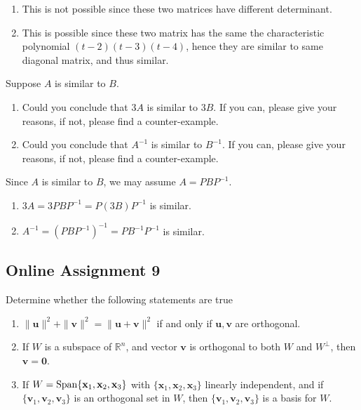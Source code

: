 \documentclass[a4paper,10pt]{article}
\begin{document}
\begin{solution}
\begin{enumerate}[label=\alph*)]
\item This is not possible since these two matrices have different determinant.
\item This is possible since these two matrix has the same the characteristic polynomial $(t-2)(t-3)(t-4)$, hence they are similar to same diagonal matrix, and thus similar.
\end{enumerate}
\end{solution}

\begin{problem}
Suppose $A$ is similar to $B$.
\begin{enumerate}[label=\alph*)]
\item Could you conclude that $3A$ is similar to $3B$. If you can, please give your reasons, if not, please find a counter-example.
\item Could you conclude that $A^{-1}$ is similar to $B^{-1}$. If you can, please give your reasons, if not, please find a counter-example.
\end{enumerate}
\end{problem}

\begin{solution}
Since $A$ is similar to $B$, we may assume $A=PBP^{-1}$.
\begin{enumerate}[label=\alph*)]
\item $3A=3PBP^{-1}=P(3B)P^{-1}$ is similar.
\item $A^{-1}=(PBP^{-1})^{-1}=PB^{-1}P^{-1}$ is similar.
\end{enumerate}
\end{solution}

\subsection{Online Assignment 9}

\begin{problem}
Determine whether the following statements are true
\begin{enumerate}[label=\alph*)]
\item $\|\mathbf u\|^2+\|\mathbf v\|^2=\|\mathbf u+\mathbf v\|^2$ if and only if $\mathbf u,\mathbf v$ are orthogonal.
\item If $W$ is a subspace of $\mathbb R^n$, and vector $\mathbf v$ is orthogonal to both $W$ and $W^\perp$, then $\mathbf v=\mathbf0$.
\item If $W = \operatorname{Span}\{\mathbf x_1, \mathbf x_2 ,\mathbf x_3\}$ with $\{\mathbf x_1, \mathbf x_2 ,\mathbf x_3\}$ linearly independent, and if $\{\mathbf v_1, \mathbf v_2 ,\mathbf v_3\}$ is an orthogonal set in $W$, then $\{\mathbf v_1, \mathbf v_2 ,\mathbf v_3\}$ is a basis for $W$.
\end{enumerate}
\end{problem}
\end{document}
